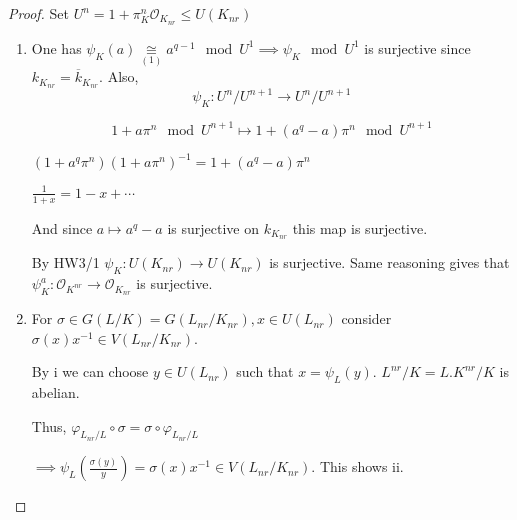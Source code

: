 \documentclass{article}
\theoremstyle{definition}
\numberwithin{theorem}{subsection}
\begin{document}
    \begin{proof}
        Set \(U^n = 1 + \pi_K^n \mathcal{O}_{K_{nr}} \leq U(K_{nr})\)
        
        \begin{enumerate}[label=\roman*)]
            \item One has \(\psi_K(a) \underset{(1)}{\cong} a^{q-1} \mod U^1 \implies \psi_K \mod U^1\) is surjective since \(k_{K_{nr}} = \overline{k}_{K_{nr}}\). Also,
            \[
                \psi_K : U^n / U^{n+1} \to U^n / U^{n+1} 
            \]

            \[
                1 + a \pi^n \mod U^{n+1} \mapsto  1 + (a^q - a) \pi^n \mod U^{n+1}
            \]

            \((1+a^q \pi^n)(1 + a \pi^n) ^{-1} = 1 + (a^q - a) \pi^n\)

            \(\frac{1}{1+x} = 1 - x + \cdots\)
            
            And since \(a \mapsto a^q - a\) is surjective on \(k_{K_{nr}}\) this map is surjective.

            By HW3/1 \(\psi_K : U(K_{nr}) \to U(K_{nr})\) is surjective. Same reasoning gives that \(\psi_K^a : \mathcal{O}_{K^{nr}} \to \mathcal{O}_{K_{nr}}\) is surjective.

            \item For \(\sigma \in G(L / K) = G(L_{nr} / K_{nr}), x\in U(L_{nr})\) consider \(\sigma (x) x ^{-1} \in V(L_{nr} / K_{nr})\).
            
            By i we can choose \(y\in U(L_{nr})\) such that \(x = \psi_L (y)\). \(L^{nr} / K = L . K^{nr} / K\) is abelian.

            Thus, \(\varphi_{L_{nr} / L} \circ \sigma = \sigma \circ \varphi_{L_{nr} / L}\)
            
            \(\implies \psi_L \left( \frac{\sigma(y)}{y} \right) = \sigma (x) x ^{-1} \in V(L_{nr} / K_{nr})\). This shows ii. 
            
            
            
        \end{enumerate} 
    \end{proof}
\end{document}
